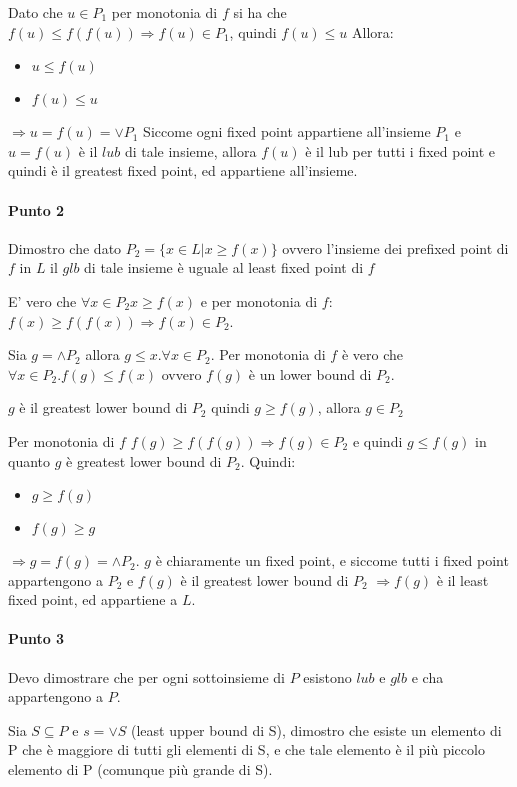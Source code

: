 \documentclass{article}
\newcommand{\pd}{P_{2}}
\begin{document}
Dato che $u \in P_{1}$ per monotonia di $f$ si ha che $f(u)\leq f(f(u)) \Rightarrow f(u) \in P_{1}$, quindi $f(u)\leq u$ Allora:
\begin{itemize}
    \item $u\leq f(u)$
    \item $f(u)\leq u$
\end{itemize}
$\Rightarrow u=f(u)=\lor P_{1}$
Siccome ogni fixed point appartiene all'insieme $P_{1}$ e $u=f(u)$ è il $lub$ di tale insieme, allora $f(u)$ è il lub per tutti i fixed point e quindi è il greatest fixed point, ed appartiene all'insieme.

\paragraph{Punto 2} Dimostro che dato $\pd = \{x \in L | x \geq f(x) \}$ ovvero l'insieme dei prefixed point di $f$ in $L$ il $glb$ di tale insieme è uguale al least fixed point di $f$

E' vero che $\forall x \in \pd x \geq f(x)$ e per monotonia di $f$: $f(x) \geq f(f(x)) \Rightarrow f(x) \in \pd$.

Sia $g = \land \pd $ allora $g \leq x . \forall x \in \pd$. Per monotonia di $f$ è vero che $\forall x \in \pd . f(g) \leq f(x)$ ovvero $f(g)$ è un lower bound di $\pd$.

$g$ è il greatest lower bound di $\pd$ quindi $g \geq f(g) $, allora $g \in \pd$

Per monotonia di $f$ $f(g) \geq f(f(g)) \Rightarrow f(g) \in \pd$ e quindi $g\leq f(g)$ in quanto $g $ è greatest lower bound di $\pd$. Quindi:
\begin{itemize}
    \item $g\geq f(g)$
    \item $f(g) \geq g$
\end{itemize}

$\Rightarrow g = f(g) = \land \pd$. $g$ è chiaramente un fixed point, e siccome tutti i fixed point appartengono a $\pd$  e $f(g) $ è il greatest lower bound di $\pd$ $\Rightarrow f(g)$ è il least fixed point, ed appartiene a $L$.

\paragraph{Punto 3} Devo dimostrare che per ogni sottoinsieme di $P$ esistono $lub$ e $glb$ e cha appartengono a $P$.

Sia $ S \subseteq P$ e $ s = \lor S$ (least upper bound di S), dimostro che esiste un elemento di P che è maggiore di tutti gli elementi di S, e che tale elemento è il più piccolo elemento di P (comunque più grande di S).
\end{document}
